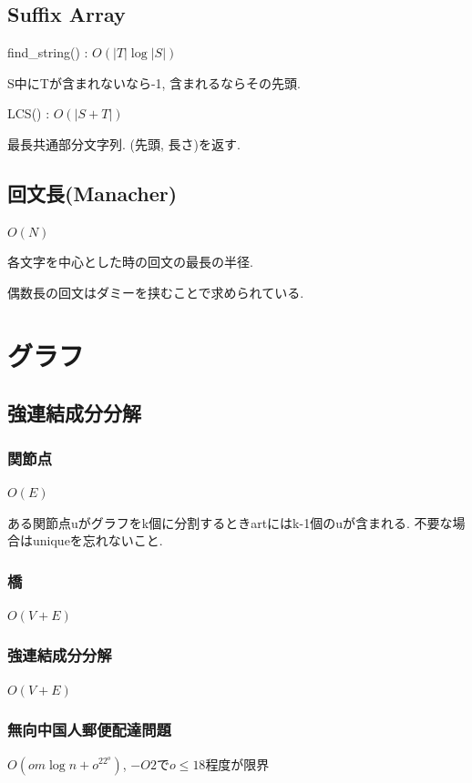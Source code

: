\documentclass[9pt,twocolumn,a4paper,landscape]{extarticle}
\begin{document}
\subsection{Suffix Array}
find\_string() : $O(|T|\log |S|)$\par
S中にTが含まれないなら-1, 含まれるならその先頭.\par
LCS() : $O(|S+T|)$\par
最長共通部分文字列. (先頭, 長さ)を返す.



\subsection{回文長(Manacher)}
$O(N)$\par
各文字を中心とした時の回文の最長の半径.\par
偶数長の回文はダミーを挟むことで求められている.\par


\section{グラフ}

\subsection{強連結成分分解}
\subsubsection{関節点}
$O(E)$\par
ある関節点uがグラフをk個に分割するときartにはk-1個のuが含まれる. 不要な場合はuniqueを忘れないこと.\par


\subsubsection{橋}
$O(V+E)$\par


\subsubsection{強連結成分分解}
$O(V+E)$\par


\subsubsection{無向中国人郵便配達問題}
$O(om\log n+o^22^o)$, $-O2$で$o\leq 18$程度が限界

\end{document}
